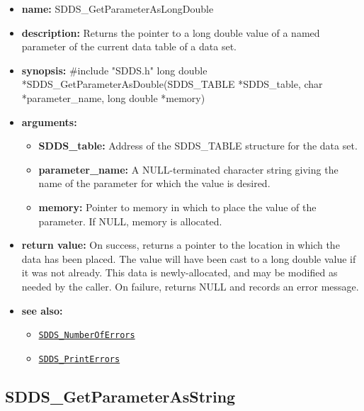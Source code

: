 \documentclass[11pt]{article}
\newcommand{\progref}[1]{\hyperref[SDDS_#1]{\tt SDDS\_#1}}
\begin{document}
\begin{itemize}
\item {\bf name:}\newline
SDDS\_GetParameterAsLongDouble
\item {\bf description:}\newline
Returns the pointer to a long double value of a named parameter of the current data table of a data set.
\item {\bf synopsis:} \#include "SDDS.h"\newline
long double *SDDS\_GetParameterAsDouble(SDDS\_TABLE *SDDS\_table, char *parameter\_name, long double *memory)
\item {\bf arguments:}
\begin{itemize}
\item {\bf SDDS\_table:} Address of the SDDS\_TABLE structure for the data set.
\item {\bf parameter\_name:} A NULL-terminated character string giving the name of the parameter for which the value is desired.
\item {\bf memory:} Pointer to memory in which to place the value of the parameter. If NULL, memory is allocated.
\end{itemize}
\item {\bf return value:}\newline
On success, returns a pointer to the location in which the data has been placed. The value will have been cast to a long double value if it was not already. This data is newly-allocated, and may be modified as needed by the caller. On failure, returns NULL and records an error message.
\item {\bf see also:}
\begin{itemize}
\item \progref{NumberOfErrors}
\item \progref{PrintErrors}
\end{itemize}
\end{itemize}

\subsection{SDDS\_GetParameterAsString}
\label{SDDS_GetParameterAsDouble}
\end{document}
